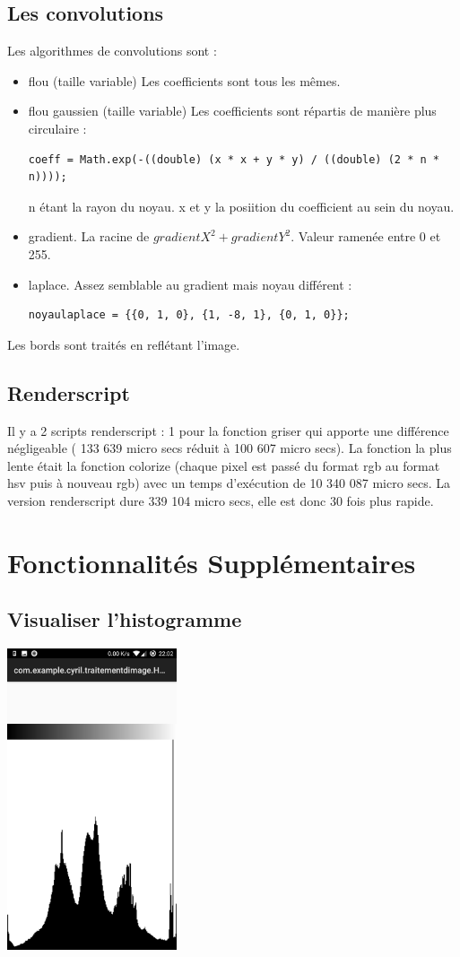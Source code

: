 \documentclass[a4paper, 12pt]{report}
\begin{document}
\subsection{Les convolutions}
Les algorithmes de convolutions sont :
\begin{itemize}
\item flou (taille variable) Les coefficients sont tous les mêmes.
\item flou gaussien (taille variable) Les coefficients sont répartis de manière plus circulaire :
\begin{lstlisting}
coeff = Math.exp(-((double) (x * x + y * y) / ((double) (2 * n * n))));
\end{lstlisting}
n étant la rayon du noyau. x et y la posiition du coefficient au sein du noyau.
\item gradient. La racine de $gradientX^2 + gradientY^2$. Valeur ramenée entre 0 et 255.
\item laplace. Assez semblable au gradient mais noyau différent :
\begin{lstlisting}
noyaulaplace = {{0, 1, 0}, {1, -8, 1}, {0, 1, 0}};
\end{lstlisting}
\end {itemize}
Les bords sont traités en reflétant l'image.
\subsection{Renderscript}
Il y a 2 scripts renderscript : 1 pour la fonction griser qui apporte une différence négligeable ( 133 639 micro secs réduit à 100 607 micro secs). La fonction la plus lente était la fonction colorize (chaque pixel est passé du format rgb au format hsv puis à nouveau rgb) avec un temps d'exécution de 10 340 087 micro secs. La version renderscript dure 339 104 micro secs, elle est donc 30 fois plus rapide.
\section{Fonctionnalités Supplémentaires}
\subsection{Visualiser l'histogramme}
\includegraphics[width=5cm,scale=1]{ressources/histo.jpg}
\end{document}
